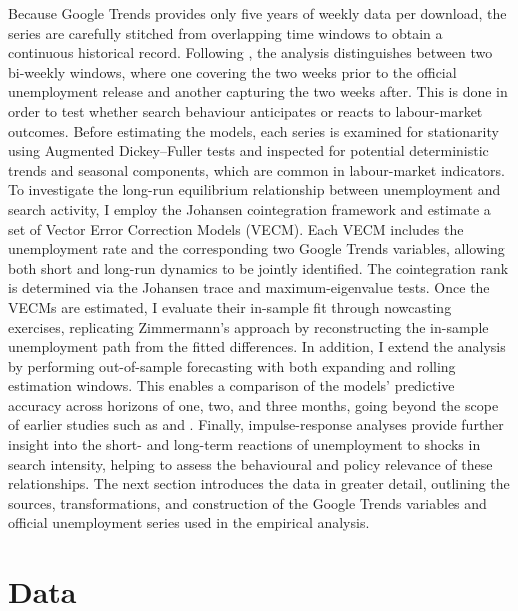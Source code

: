 \documentclass[12pt,a4paper]{article}
\begin{document}
Because Google Trends provides only five years of weekly data per download, the series are carefully stitched from overlapping time windows to obtain a continuous historical record. 
Following \textcite{Zimmermann2012}, the analysis distinguishes between two bi-weekly windows, where one covering the two weeks prior to the official unemployment release and another capturing the two weeks after. This is done in order to test whether search behaviour anticipates or reacts to labour-market outcomes.
Before estimating the models, each series is examined for stationarity using Augmented Dickey–Fuller tests and inspected for potential deterministic trends and seasonal components, which are common in labour-market indicators. 
To investigate the long-run equilibrium relationship between unemployment and search activity, I employ the Johansen cointegration framework and estimate a set of Vector Error Correction Models (VECM). 
Each VECM includes the unemployment rate and the corresponding two Google Trends variables, allowing both short and long-run dynamics to be jointly identified. 
The cointegration rank is determined via the Johansen trace and maximum-eigenvalue tests.
Once the VECMs are estimated, I evaluate their in-sample fit through nowcasting exercises, replicating Zimmermann’s approach by reconstructing the in-sample unemployment path from the fitted differences. 
In addition, I extend the analysis by performing out-of-sample forecasting with both expanding and rolling estimation windows. 
This enables a comparison of the models’ predictive accuracy across horizons of one, two, and three months, going beyond the scope of earlier studies such as \textcite{Zimmermann2012} and \textcite{Askitas2009}. 
Finally, impulse-response analyses provide further insight into the short- and long-term reactions of unemployment to shocks in search intensity, helping to assess the behavioural and policy relevance of these relationships.
The next section introduces the data in greater detail, outlining the sources, transformations, and construction of the Google Trends variables and official unemployment series used in the empirical analysis.

\section{Data}
\end{document}
